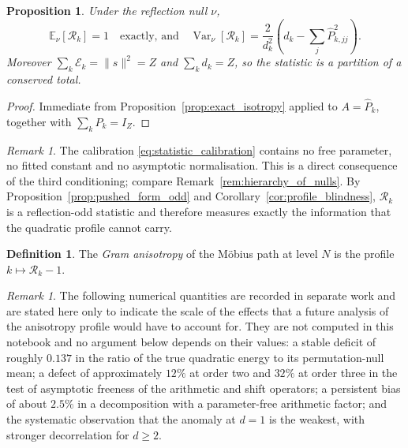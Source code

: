 \documentclass[11pt]{amsart}
\numberwithin{equation}{section}
\theoremstyle{plain}
\newtheorem{proposition}[theorem]{Proposition}
\theoremstyle{definition}
\newtheorem{definition}[theorem]{Definition}
\theoremstyle{remark}
\newtheorem{remark}[theorem]{Remark}
\DeclareMathOperator{\Var}{Var}
\begin{document}
\begin{proposition}
\label{prop:statistic_calibration}
Under the reflection null $\nu$,
\begin{equation}
\mathbb{E}_\nu\!\left[\mathcal{R}_k\right] = 1
\quad\text{exactly, and}\quad
\Var_\nu\!\left[\mathcal{R}_k\right]
= \frac{2}{d_k^2}\left( d_k - \sum_j \widehat{P}_{k,jj}^2 \right).
\label{eq:statistic_calibration}
\end{equation}
Moreover $\sum_k \mathcal{E}_k = \|s\|^2 = Z$ and $\sum_k d_k = Z$, so
the statistic is a partition of a conserved total.
\end{proposition}

\begin{proof}
Immediate from Proposition~\ref{prop:exact_isotropy} applied to
$A = \widehat{P}_k$, together with $\sum_k \widehat{P}_k = I_Z$.
\end{proof}

\begin{remark}
\label{rem:no_free_parameters}
The calibration \eqref{eq:statistic_calibration} contains no free
parameter, no fitted constant and no asymptotic normalisation. This is
a direct consequence of the third conditioning; compare
Remark~\ref{rem:hierarchy_of_nulls}. By
Proposition~\ref{prop:pushed_form_odd} and
Corollary~\ref{cor:profile_blindness}, $\mathcal{R}_k$ is a
reflection-odd statistic and therefore measures exactly the information
that the quadratic profile cannot carry.
\end{remark}

\begin{definition}
\label{def:anisotropy}
The \emph{Gram anisotropy} of the M\"obius path at level $N$ is the
profile $k \mapsto \mathcal{R}_k - 1$.
\end{definition}

\begin{remark}
\label{rem:empirical_inputs}
The following numerical quantities are recorded in separate work and
are stated here only to indicate the scale of the effects that a future
analysis of the anisotropy profile would have to account for. They are
not computed in this notebook and no argument below depends on their
values: a stable deficit of roughly $0.137$ in the ratio of the true
quadratic energy to its permutation-null mean; a defect of
approximately $12\%$ at order two and $32\%$ at order three in the test
of asymptotic freeness of the arithmetic and shift operators; a
persistent bias of about $2.5\%$ in a decomposition with a
parameter-free arithmetic factor; and the systematic observation that
the anomaly at $d=1$ is the weakest, with stronger decorrelation for
$d \ge 2$.
\end{remark}
\end{document}
